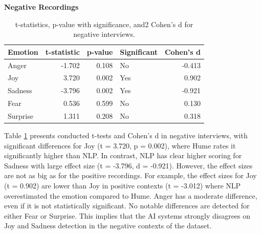 \begin{table}[H]
    \centering
    \caption*{\textbf{Negative Recordings}}
    \begin{tabular}{lrrlr}
      \toprule
      \textbf{Emotion} & \textbf{t-statistic} & \textbf{p-value} & \textbf{Significant} & \textbf{Cohen’s d} \\
      \midrule
      Anger    & -1.702 & 0.108   & No  & -0.413 \\
      Joy      &  3.720 & 0.002   & Yes &  0.902 \\
      Sadness  & -3.796 & 0.002   & Yes & -0.921 \\
      Fear     &  0.536 & 0.599   & No  &  0.130 \\
      Surprise &  1.311 & 0.208   & No  &  0.318 \\
      \bottomrule
    \end{tabular}
    \caption{t-statistics, p-value with significance, and2 Cohen’s d for negative interviews.}
    \label{tab:t-test-neg}
  \end{table}
Table \ref{tab:t-test-neg} presents conducted t-tests and Cohen's d in negative interviews, with significant differences for Joy (t = 3.720, p = 0.002), where Hume rates it significantly higher than NLP. 
In contrast, NLP has clear higher scoring for Sadness with large effect size (t = -3.796, d = -0.921). However, the effect sizes are not as big as for the positive recordings. 
For example, the effect sizes for Joy (t = 0.902) are lower than Joy in positive contexts (t = -3.012) where NLP overestimated the emotion compared to Hume.
Anger has a moderate difference, even if it is not statistically significant. No notable differences are detected for either Fear or Surprise. 
This implies that the AI systems strongly disagrees on Joy and Sadness detection in the negative contexts of the dataset. 

